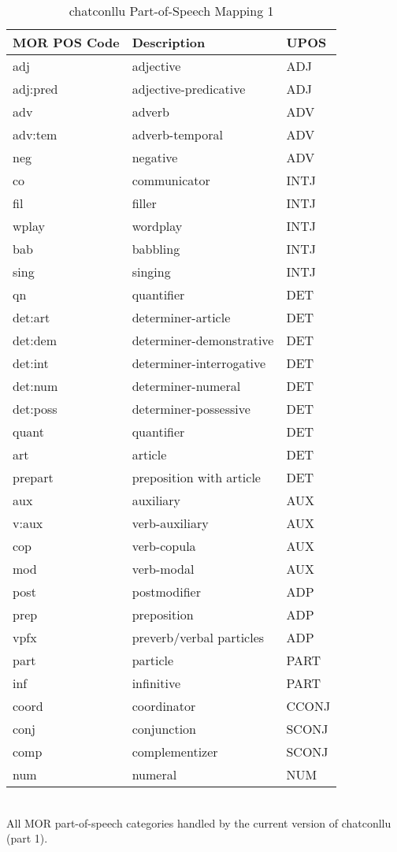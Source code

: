 \newpage
\begin{table}[htp!]
\caption {chatconllu Part-of-Speech Mapping 1} \label{tab:posmap1}
\centering
\begin{tabularx}{\linewidth}{@{}lXl@{}}
\toprule
\textbf{MOR POS Code} & \textbf{Description} & \textbf{UPOS}\\ \midrule
adj & adjective & ADJ\\
adj:pred & adjective-predicative & ADJ\\\midrule
adv & adverb & ADV\\
adv:tem & adverb-temporal & ADV\\
neg & negative & ADV\\\midrule
co & communicator & INTJ\\
fil & filler & INTJ\\
wplay & wordplay & INTJ\\
bab & babbling & INTJ\\
sing & singing & INTJ\\\midrule
qn & quantifier & DET\\
det:art & determiner-article & DET\\
det:dem & determiner-demonstrative & DET\\
det:int & determiner-interrogative & DET\\
det:num & determiner-numeral & DET\\
det:poss & determiner-possessive & DET\\
quant & quantifier & DET\\
art & article & DET\\
prepart & preposition with article & DET\\\midrule
aux & auxiliary & AUX\\
v:aux & verb-auxiliary & AUX\\
cop & verb-copula & AUX\\
mod & verb-modal & AUX\\\midrule
post & postmodifier & ADP\\
prep & preposition & ADP\\
vpfx & preverb/verbal particles & ADP\\\midrule
part & particle & PART\\
inf & infinitive & PART\\\midrule
coord & coordinator & CCONJ\\\midrule
conj & conjunction & SCONJ\\
comp & complementizer & SCONJ\\\midrule
num & numeral & NUM\\\bottomrule
\end{tabularx}\\
\vspace{0.5cm}
All MOR part-of-speech categories handled by the current version of chatconllu (part 1).\\
\end{table}

